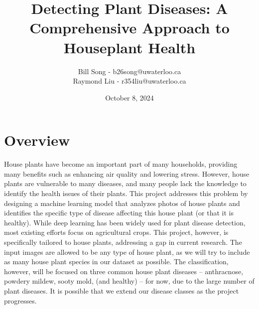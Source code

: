 \documentclass[12pt]{article}
\title{%
  Detecting Plant Diseases: A Comprehensive Approach to Houseplant Health }
\author{Bill Song - b26song@uwaterloo.ca\\Raymond Liu - r354liu@uwaterloo.ca}
\date{October 8, 2024}
\begin{document}
\maketitle



\section{Overview}

House plants have become an important part of many households, providing many benefits such as enhancing air quality and lowering stress. However, house plants are vulnerable to many diseases, and many people lack the knowledge to identify the health issues of their plants. This project addresses this problem by designing a machine learning model that analyzes photos of house plants and identifies the specific type of disease affecting this house plant (or that it is healthy). While deep learning has been widely used for plant disease detection, most existing efforts focus on agricultural crops. This project, however, is specifically tailored to house plants, addressing a gap in current research. The input images are allowed to be any type of house plant, as we will try to include as many house plant species in our dataset as possible. The classification, however, will be focused on three common house plant diseases -- anthracnose, powdery mildew, sooty mold, (and healthy) -- for now, due to the large number of plant diseases. It is possible that we extend our disease classes as the project progresses. 
\end{document}
